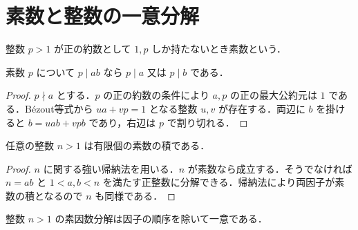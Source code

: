 \section{素数と整数の一意分解}
\begin{defn}[素数]
整数 $p>1$ が正の約数として $1,p$ しか持たないとき素数という．
\end{defn}
\begin{prop}[素数の積の整除]
素数 $p$ について $p\mid ab$ なら $p\mid a$ 又は $p\mid b$ である．
\end{prop}
\begin{proof}
$p\nmid a$ とする．$p$ の正の約数の条件により $a,p$ の正の最大公約元は $1$ である．Bézout等式から $ua+vp=1$ となる整数 $u,v$ が存在する．両辺に $b$ を掛けると $b=uab+vpb$ であり，右辺は $p$ で割り切れる．
\end{proof}
\begin{prop}[素因数分解の存在]
任意の整数 $n>1$ は有限個の素数の積である．
\end{prop}
\begin{proof}
$n$ に関する強い帰納法を用いる．$n$ が素数なら成立する．そうでなければ $n=ab$ と $1<a,b<n$ を満たす正整数に分解できる．帰納法により両因子が素数の積となるので $n$ も同様である．
\end{proof}
\begin{prop}[素因数分解の一意性]
整数 $n>1$ の素因数分解は因子の順序を除いて一意である．
\end{prop}
